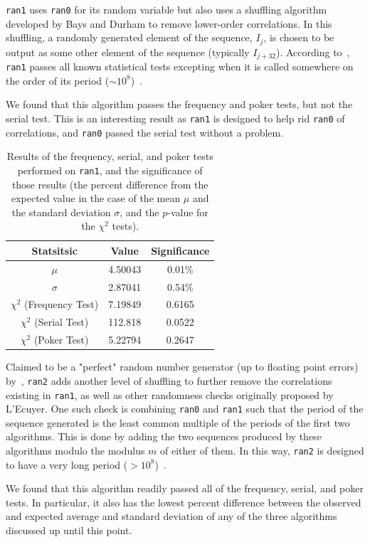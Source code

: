\documentclass[12pt]{article}
\numberwithin{equation}{section}
\begin{document}
\par \texttt{ran1} uses \texttt{ran0} for its random variable but also uses a shuffling algorithm developed by Bays and Durham to remove lower-order correlations.  In this shuffling, a randomly generated element of the sequence, $I_{j}$, is chosen to be output as some other element of the sequence (typically $I_{j+32}$).  According to~\cite{recipes}, \texttt{ran1} passes all known statistical tests excepting when it is called somewhere on the order of its period ($\sim10^{8}$)~\cite{recipes}.
\par We found that this algorithm passes the frequency and poker tests, but not the serial test.  This is an interesting result as \texttt{ran1} is designed to help rid \texttt{ran0} of correlations, and \texttt{ran0} passed the serial test without a problem.  

\begin{table}[ht]
\begin{center}
\begin{tabular}{c|c|c} \hline
Statsitsic & Value & Significance\\\hline
$\mu$ & 4.50043 & 0.01\%\\
$\sigma$ & 2.87041 & 0.54\%\\
$\chi^{2}$ (Frequency Test) & 7.19849 & 0.6165\\
$\chi^{2}$ (Serial Test) & 112.818 & 0.0522\\
$\chi^{2}$ (Poker Test) & 5.22794 & 0.2647\\ \hline
\end{tabular}
\caption{Results of the frequency, serial, and poker tests performed on \texttt{ran1}, and the significance of those results (the percent difference from the expected value in the case of the mean $\mu$ and the standard deviation $\sigma$, and the $p$-value for the $\chi^{2}$ tests).}
\label{tab:ran1results}
\end{center}
\end{table}

\par Claimed to be a "perfect" random number generator (up to floating point errors) by~\cite{recipes}, \texttt{ran2} adds another level of shuffling to further remove the correlations existing in \texttt{ran1}, as well as other randomness checks originally proposed by L'Ecuyer.  One such check is combining \texttt{ran0} and \texttt{ran1} such that the period of the sequence generated is the least common multiple of the periods of the first two algorithms.  This is done by adding the two sequences produced by these algorithms modulo the modulus $m$ of either of them.  In this way, \texttt{ran2} is designed to have a very long period ($>10^{8}$)~\cite{recipes}.
\par We found that this algorithm readily passed all of the frequency, serial, and poker tests.  In particular, it also has the lowest percent difference between the observed and expected average and standard deviation of any of the three algorithms discussed up until this point.
\end{document}
